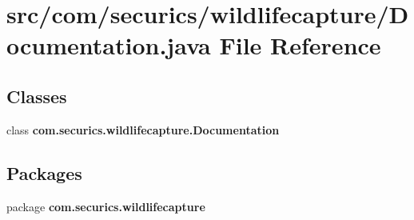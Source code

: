 \section{src/com/securics/wildlifecapture/\+Documentation.java File Reference}
\label{_documentation_8java}
\subsection*{Classes}
\begin{DoxyCompactItemize}
\item 
class {\bf com.\+securics.\+wildlifecapture.\+Documentation}
\end{DoxyCompactItemize}
\subsection*{Packages}
\begin{DoxyCompactItemize}
\item 
package {\bf com.\+securics.\+wildlifecapture}
\end{DoxyCompactItemize}

